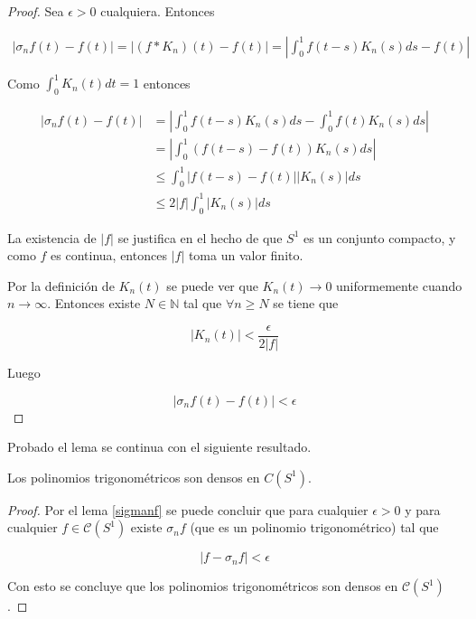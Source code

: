 \begin{proof}
	Sea $\epsilon >0$ cualquiera. Entonces
	
	\begin{multline}
		|\sigma_n f(t) - f(t)| = \left| (f * K_n)(t) - f(t)  \right| = \left| \int_{0}^{1} f(t-s) K_n(s) ds - f(t) \right|
	\end{multline}
	
	Como $\int_{0}^{1} K_n(t)dt = 1$ entonces
	
	\begin{align}
		|\sigma_n f(t) - f(t)| &= \left| \int_{0}^{1} f(t-s) K_n(s)ds - \int_{0}^{1} f(t) K_n(s)ds \right|\\
		&= \left| \int_{0}^{1} (f(t-s)-f(t)) K_n(s)ds \right|\\
		&\leq \int_{0}^{1} | f(t-s)-f(t) | |K_n(s)| ds\\
		&\leq 2|f| \int_{0}^{1} |K_n(s)|ds
	\end{align}
	
	La existencia de $|f|$ se justifica en el hecho de que $S^1$ es un conjunto compacto, y como $f$ es continua, entonces $|f|$ toma un valor finito.
	
	Por la definición de $K_n(t)$ se puede ver que $K_n(t) \rightarrow 0$ uniformemente cuando $n \rightarrow \infty$. Entonces existe $N \in \mathbb{N}$ tal que $\forall n \geq N$ se tiene que
	
	\begin{equation}
		|K_n(t)| < \frac{\epsilon}{2|f|}
	\end{equation}
	
	Luego
	
	\begin{equation}
		|\sigma_n f(t) - f(t)| < \epsilon
	\end{equation}
\end{proof}

Probado el lema se continua con el siguiente resultado.

\begin{teorema}
	Los polinomios trigonométricos son densos en $C(S^1)$.
\end{teorema}

\begin{proof}
	Por el lema \ref{sigmanf} se puede concluir que para cualquier $\epsilon > 0$ y para cualquier $f \in \mathcal{C}(S^1)$ existe $\sigma_n f$ (que es un polinomio trigonométrico) tal que
	
	\begin{equation}
		|f - \sigma_n f| < \epsilon
	\end{equation}
	
	Con esto se concluye que los polinomios trigonométricos son densos en $\mathcal{C}(S^1)$.
\end{proof}
